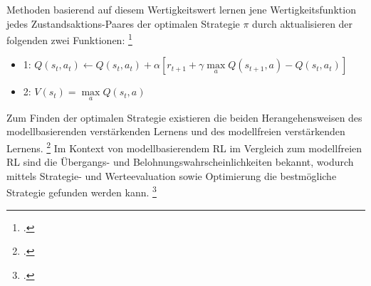 Methoden basierend auf diesem Wertigkeitswert lernen jene Wertigkeitsfunktion jedes Zustandsaktions-Paares der optimalen Strategie $\pi$ durch aktualisieren der folgenden zwei Funktionen: \footcite[Vgl.][S. 2]{Zhang.2018}
\begin{itemize}
    \item 1: $Q(s_{t}, a_{t}) \leftarrow Q(s_{t}, a_{t}) + \alpha\left[r_{t+1} + \gamma\max\limits_{a}Q(s_{t+1},a)-Q(s_{t},a_{t})\right]$
    \item 2: $V(s_{t}) = \max\limits_{a}Q(s_{t},a)$
\end{itemize}
Zum Finden der optimalen Strategie existieren die beiden Herangehensweisen des modellbasierenden verstärkenden Lernens und des modellfreien verstärkenden Lernens. \footcite[Vgl.][S. 3]{Wang.2020}
Im Kontext von modellbasierendem RL im Vergleich zum modellfreien RL sind die Übergangs- und Belohnungswahrscheinlichkeiten bekannt, wodurch mittels Strategie- und Werteevaluation sowie Optimierung die bestmögliche Strategie gefunden werden kann. \footcite[Vgl.][S. 5]{Li.2019}

